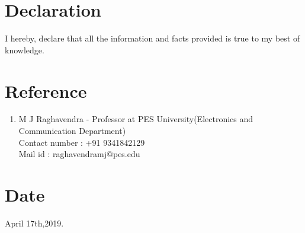 \documentclass{article}
\begin{document}
	\section{Declaration}
	I hereby, declare that all the information and facts provided is true to my best of knowledge.
	
	\section{Reference}
	\begin{enumerate}
		\item M J Raghavendra - Professor at PES University(Electronics and Communication Department)
		\\Contact number : +91 9341842129
		\\Mail id : raghavendramj@pes.edu	
	\end{enumerate}

	\section{Date}
	April 17th,2019.
\end{document}
